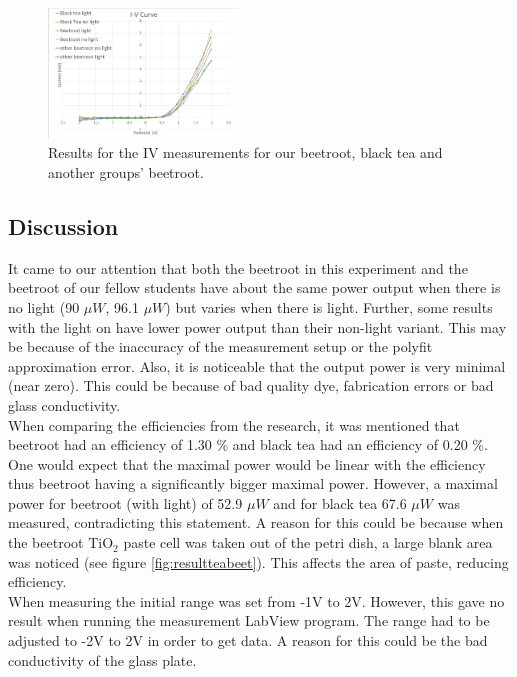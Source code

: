 \documentclass[conference]{IEEEtran}
\begin{document}
 
\begin{figure}[H]
\centering
\includegraphics[width=0.45\textwidth]{img/IVCURVE.png}
\caption{Results for the IV measurements for our beetroot, black tea and another groups' beetroot.}
\label{fig:redbeetcurve} %
\end{figure}

\subsection{Discussion}

It came to our attention that both the beetroot in this experiment and the beetroot of our fellow students have about the same power output when there is no light (90 $\mu W$, 96.1  $\mu W$) but varies when there is light. Further, some results with the light on have lower power output than their non-light variant. This may be because of the inaccuracy of the measurement setup or the polyfit approximation error. Also, it is noticeable that the output power is very minimal (near zero). This could be because of bad quality dye, fabrication errors or bad glass conductivity.\\

When comparing the efficiencies from the research, it was mentioned that beetroot had an efficiency of 1.30 \% and black tea had an efficiency of 0.20 \%. One would expect that the maximal power would be linear with the efficiency thus beetroot having a significantly bigger maximal power. However,  a maximal power for beetroot (with light) of 52.9 $\mu W$ and for black tea 67.6 $\mu W$ was measured, contradicting this statement. A reason for this could be because when the beetroot TiO$_2$ paste cell was taken out of the petri dish, a large blank area was noticed (see figure \ref{fig:resultteabeet}). This affects the area of paste, reducing efficiency.\\

When measuring the initial range was set from -1V to 2V. However, this gave no result when running the measurement LabView program. The range had to be adjusted to -2V to 2V in order to get data. A reason for this could be the bad conductivity of the glass plate.
\end{document}
